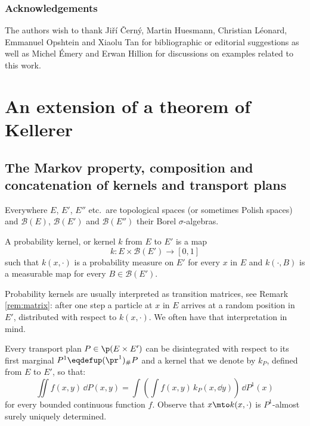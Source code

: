 \subsubsection*{Acknowledgements} The authors wish to thank Ji\v rí \v Cern\'y, Martin Huesmann, Christian Léonard, Emmanuel Opshtein and Xiaolu Tan for bibliographic or editorial suggestions as well as Michel Émery and Erwan Hillion for discussions on examples related to this work.

\section{An extension of a theorem of Kellerer}\label{sec:concatenation+kellerer+boujui}

\subsection{The Markov property, composition and concatenation of kernels and transport plans}\label{subsec:kernels_markov}

Everywhere $E$, $E'$, $E''$ etc.\ are topological spaces (or sometimes Polish spaces) and $\mathcal{B}(E)$, $\mathcal{B}(E')$ and $\mathcal{B}(E'')$ their Borel $\sigma$-algebras.

\begin{defi}
A probability kernel, or kernel $k$ from $E$ to $E'$ is a map\vspace*{-3pt}\enlargethispage{.5\baselineskip}%
\[
k:E\times \mathcal{B}(E')\to [0,1]
\]
such that $k(x,\cdot)$ is a probability measure on $E'$ for every $x$ in $E$ and $k(\cdot,B)$ is a measurable map for every $B\in {\mathcal B}(E')$.
\end{defi}

Probability kernels are usually interpreted as transition matrices, see Remark \ref{rem:matrix}: after one step a particle at $x$ in $E$ arrives at a random position in $E'$, distributed with respect to $k(x,\cdot)$. We often have that interpretation in mind.

\begin{remnotation}\label{notation:k_P}Every transport plan $P\in\p(E\times E')$ can be disintegrated with respect to its first marginal $P^1\eqdefup(\pr^1)_\#P$ and a kernel that we denote by $k_P$, defined from $E$ to $E'$, so that:\vspace*{-3pt}
\[\iint f(x,y)\,\dd P(x,y)=\int\left(\int f(x,y)\,k_P(x,\dd y)\right)\,\dd P^1(x)\]
for every bounded continuous function $f$. Observe that $x\mto k(x,\cdot)$ is $P^1$-almost surely uniquely determined.
\end{remnotation}

